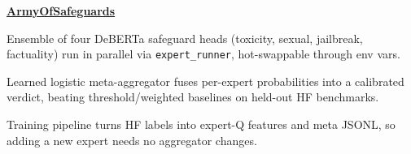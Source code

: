 \begin{twocolentry}{}
\href{https://github.com/faketut/ArmyOfSafeguards}{\textbf{ArmyOfSafeguards}}
\end{twocolentry}
\begin{onecolentry}
\begin{highlights}
\item Ensemble of four DeBERTa safeguard heads (toxicity, sexual, jailbreak, factuality) run in parallel via \texttt{expert\_runner}, hot-swappable through env vars.
\item Learned logistic meta-aggregator fuses per-expert probabilities into a calibrated verdict, beating threshold/weighted baselines on held-out HF benchmarks.
\item Training pipeline turns HF labels into expert-Q features and meta JSONL, so adding a new expert needs no aggregator changes.
\end{highlights}
\end{onecolentry}
